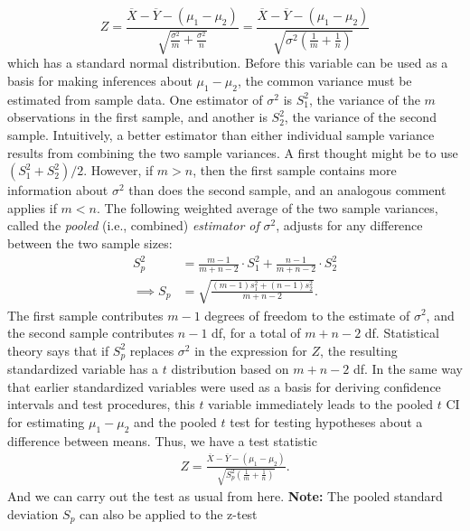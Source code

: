 \documentclass{report}
\begin{document}
\begin{itemize}
        \[
            Z = \frac{\overline{X} - \overline{Y} - (\mu_1 - \mu_2)}{\sqrt{\frac{\sigma^2}{m} + \frac{\sigma^2}{n}}} = \frac{\overline{X} - \overline{Y} - (\mu_1 - \mu_2)}{\sqrt{\sigma^2 \left( \frac{1}{m} + \frac{1}{n} \right)}}
        \]
        which has a standard normal distribution. Before this variable can be used as a basis for making inferences about $\mu_1 - \mu_2$, the common variance must be estimated from sample data. One estimator of $\sigma^2$ is $S_1^2$, the variance of the $m$ observations in the first sample, and another is $S_2^2$, the variance of the second sample. Intuitively, a better estimator than either individual sample variance results from combining the two sample variances. A first thought might be to use $(S_1^2 + S_2^2)/2$. However, if $m > n$, then the first sample contains more information about $\sigma^2$ than does the second sample, and an analogous comment applies if $m < n$. The following weighted average of the two sample variances, called the \textit{pooled} (i.e., combined) \textit{estimator of} $\sigma^2$, adjusts for any difference between the two sample sizes:
        \begin{align*}
            S_p^2 &= \frac{m - 1}{m + n - 2} \cdot S_1^2 + \frac{n - 1}{m + n - 2} \cdot S_2^2 \\
            \implies S_{p}&= \sqrt{\frac{(m-1)s_{1}^{2}+(n-1)s_{2}^{2}}{m+ n-2}}
        .\end{align*}
        The first sample contributes $m - 1$ degrees of freedom to the estimate of $\sigma^2$, and the second sample contributes $n - 1$ df, for a total of $m + n - 2$ df. Statistical theory says that if $S_p^2$ replaces $\sigma^2$ in the expression for $Z$, the resulting standardized variable has a $t$ distribution based on $m + n - 2$ df. In the same way that earlier standardized variables were used as a basis for deriving confidence intervals and test procedures, this $t$ variable immediately leads to the pooled $t$ CI for estimating $\mu_1 - \mu_2$ and the pooled $t$ test for testing hypotheses about a difference between means.
        \bigbreak \noindent 
        Thus, we have a test statistic 
        \bigbreak \noindent 
        \begin{align*}
            Z = \frac{\overline{X} - \overline{Y} - (\mu_1 - \mu_2)}{\sqrt{S_{p}^2 \left( \frac{1}{m} + \frac{1}{n} \right)}}
        .\end{align*}
        And we can carry out the test as usual from here.
        \bigbreak \noindent 
        \textbf{Note:} The pooled standard deviation $S_{p}$ can also be applied to the z-test

\end{itemize}
\end{document}
